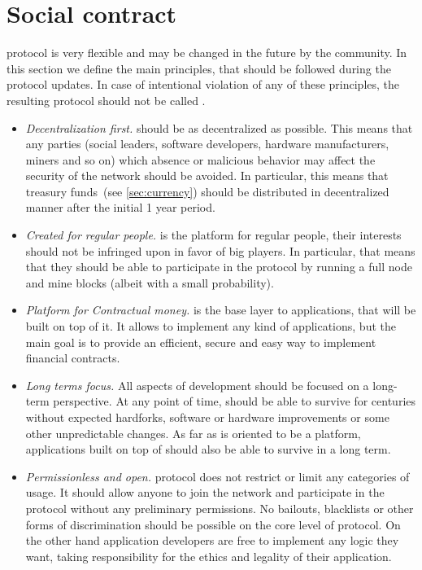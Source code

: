 \section{Social contract}
\label{sec:social}

\Ergo{} protocol is very flexible and may be changed in the future by the community.
In this section we define the main principles, that should be followed during the \Ergo{} protocol updates.
In case of intentional violation of any of these principles, the resulting protocol should not
be called \Ergo{}.

\begin{itemize}
    \item{\em Decentralization first.} \Ergo{} should be as decentralized as possible.
    This means that any parties (social leaders, software developers, hardware manufacturers, miners and so on)
    which absence or malicious behavior may affect the security of the network should be avoided.
    In particular, this means that treasury funds~(see \ref{sec:currency}) should be distributed in
    decentralized manner after the initial 1 year period.
    \item{\em Created for regular people.} \Ergo{} is the platform for regular people, their interests should not
    be infringed upon in favor of big players. In particular, that means that they should be able to
    participate in the protocol by running a full node and mine blocks (albeit with a small probability).
    \item{\em Platform for Contractual money.} \Ergo{} is the base layer to applications, that will be built
    on top of it. It allows to implement any kind of applications, but the main goal is
    to provide an efficient, secure and easy way to implement financial contracts. 
    \item{\em Long terms focus.} All aspects of \Ergo{} development should be focused on a long-term perspective.
    At any point of time, \Ergo{} should be able to survive for centuries without expected hardforks,
    software or hardware improvements or some other unpredictable changes. As far as \Ergo{} is oriented
    to be a platform, applications built on top of \Ergo{} should also be able to survive in a long term.
    \item{\em Permissionless and open.} \Ergo{} protocol does not restrict or limit any categories of usage.
    It should allow anyone to join the network and participate in the protocol without any preliminary permissions.
    No bailouts, blacklists or other forms of discrimination should be possible on the core level of \Ergo{} protocol.
    On the other hand application developers are free to implement any logic they want, taking responsibility
    for the ethics and legality of their application.
\end{itemize}